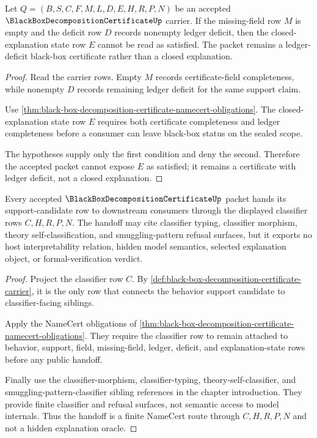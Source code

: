 \begin{theorem}
\label{thm:black-box-decomposition-certificate-deficit-nonclosure}
Let $Q=(B,S,C,F,M,L,D,E,H,R,P,N)$ be an accepted $\BlackBoxDecompositionCertificateUp$ carrier. If the missing-field row $M$ is empty and the deficit row $D$ records nonempty ledger deficit, then the closed-explanation state row $E$ cannot be read as satisfied. The packet remains a ledger-deficit black-box certificate rather than a closed explanation.
\end{theorem}
\begin{proof}
Read the carrier rows. Empty $M$ records certificate-field completeness, while nonempty $D$ records remaining ledger deficit for the same support claim.

Use \autoref{thm:black-box-decomposition-certificate-namecert-obligations}. The closed-explanation state row $E$ requires both certificate completeness and ledger completeness before a consumer can leave black-box status on the sealed scope.

The hypotheses supply only the first condition and deny the second. Therefore the accepted packet cannot expose $E$ as satisfied; it remains a certificate with ledger deficit, not a closed explanation.
\end{proof}

\begin{theorem}
\label{thm:black-box-decomposition-certificate-classifier-handoff}
Every accepted $\BlackBoxDecompositionCertificateUp$ packet hands its support-candidate row to downstream consumers through the displayed classifier rows $C,H,R,P,N$. The handoff may cite classifier typing, classifier morphism, theory self-classification, and smuggling-pattern refusal surfaces, but it exports no host interpretability relation, hidden model semantics, selected explanation object, or formal-verification verdict.
\end{theorem}
\begin{proof}
Project the classifier row $C$. By \autoref{def:black-box-decomposition-certificate-carrier}, it is the only row that connects the behavior support candidate to classifier-facing siblings.

Apply the NameCert obligations of \autoref{thm:black-box-decomposition-certificate-namecert-obligations}. They require the classifier row to remain attached to behavior, support, field, missing-field, ledger, deficit, and explanation-state rows before any public handoff.

Finally use the classifier-morphism, classifier-typing, theory-self-classifier, and smuggling-pattern-classifier sibling references in the chapter introduction. They provide finite classifier and refusal surfaces, not semantic access to model internals. Thus the handoff is a finite NameCert route through $C,H,R,P,N$ and not a hidden explanation oracle.
\end{proof}

